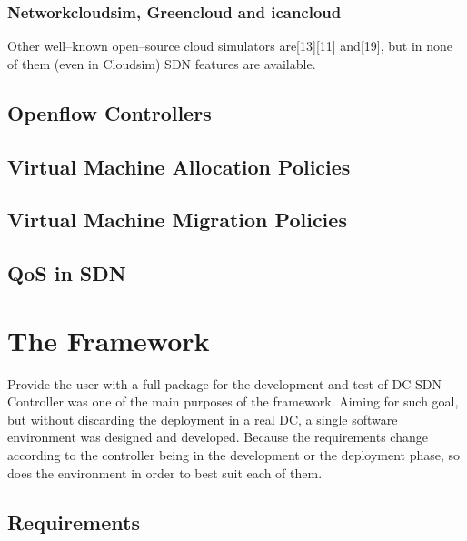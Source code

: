 \documentclass[12pt,english]{book}
\begin{document}
\subsection{Networkcloudsim, Greencloud and icancloud}

Other well--known open--source cloud simulators are[13][11] and[19], but in none of them (even in Cloudsim) SDN features are available.

\newpage
\section{Openflow Controllers}

\newpage
\section{Virtual Machine Allocation Policies}

\newpage
\section{Virtual Machine Migration Policies}

\newpage
\section{QoS in SDN}
\newpage



\chapter{The Framework \label{cha:framework} }

Provide the user with a full package for the development and test of DC SDN Controller was one of the main purposes of the framework.
Aiming for such goal, but without discarding the deployment in a real DC, a single software environment was designed and developed.
Because the requirements change according to the controller being in the development or the deployment phase, so does the environment in order to best suit each of them.

\section{Requirements}
\end{document}
